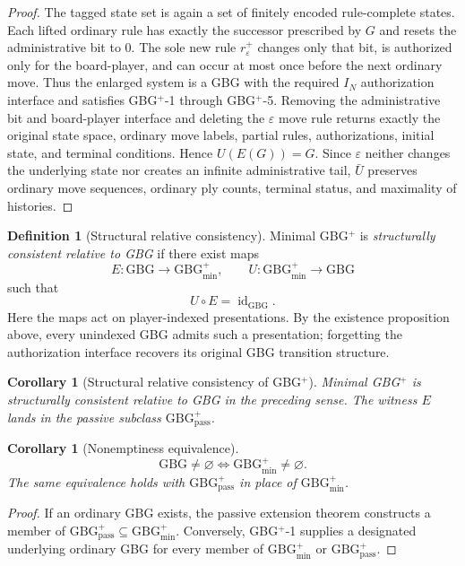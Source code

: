 \documentclass[11pt]{article}
\newtheorem{corollary}[theorem]{Corollary}
\theoremstyle{definition}
\newtheorem{definition}[theorem]{Definition}
\theoremstyle{remark}
\newcommand{\GBG}{\mathrm{GBG}}
\newcommand{\GBGmin}{\mathrm{GBG}^{+}_{\min}}
\newcommand{\GBGpass}{\mathrm{GBG}^{+}_{\mathrm{pass}}}
\newcommand{\id}{\operatorname{id}}
\begin{document}
\begin{proof}
The tagged state set is again a set of finitely encoded rule-complete states.  Each lifted ordinary rule has exactly the successor prescribed by $G$ and resets the administrative bit to $0$.  The sole new rule $r_\varepsilon^{+}$ changes only that bit, is authorized only for the board-player, and can occur at most once before the next ordinary move.  Thus the enlarged system is a GBG with the required $I_N$ authorization interface and satisfies GBG$^{+}$-1 through GBG$^{+}$-5.  Removing the administrative bit and board-player interface and deleting the $\varepsilon$ move rule returns exactly the original state space, ordinary move labels, partial rules, authorizations, initial state, and terminal conditions.  Hence $U(E(G))=G$.  Since $\varepsilon$ neither changes the underlying state nor creates an infinite administrative tail, $\bar U$ preserves ordinary move sequences, ordinary ply counts, terminal status, and maximality of histories.
\end{proof}

\begin{definition}[Structural relative consistency]
Minimal GBG$^{+}$ is \emph{structurally consistent relative to GBG} if there exist maps
\[
E:\GBG\to\GBGmin,
\qquad
U:\GBGmin\to\GBG
\]
such that
\[
U\circ E=\id_{\GBG}.
\]
Here the maps act on player-indexed presentations.  By the existence proposition above, every unindexed GBG admits such a presentation; forgetting the authorization interface recovers its original GBG transition structure.
\end{definition}

\begin{corollary}[Structural relative consistency of GBG$^{+}$]
Minimal GBG$^{+}$ is structurally consistent relative to GBG in the preceding sense.  The witness $E$ lands in the passive subclass $\GBGpass$.
\end{corollary}

\begin{corollary}[Nonemptiness equivalence]
\[
\boxed{\GBG\neq\varnothing\iff\GBGmin\neq\varnothing.}
\]
The same equivalence holds with $\GBGpass$ in place of $\GBGmin$.
\end{corollary}

\begin{proof}
If an ordinary GBG exists, the passive extension theorem constructs a member of $\GBGpass\subseteq\GBGmin$.  Conversely, GBG$^{+}$-1 supplies a designated underlying ordinary GBG for every member of $\GBGmin$ or $\GBGpass$.
\end{proof}
\end{document}
